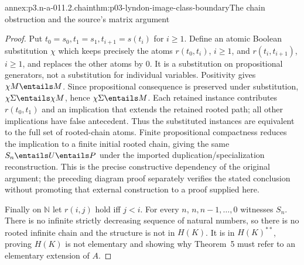 \begin{annexitem}{annex:p3.n-a-011.2.chain}{thm:p03-lyndon-image-class-boundary}{The chain obstruction and the source's matrix argument}
\begin{proof}
Put \(t_0=s_0,t_1=s_1,t_{i+1}=s(t_i)\) for \(i\geq1\).
Define an atomic Boolean substitution \(\chi\) which keeps precisely
the atoms \(r(t_0,t_i)\), \(i\geq1\), and
\(r(t_i,t_{i+1})\), \(i\geq1\), and replaces the other atoms by
\(0\). It is a substitution on propositional generators, not a
substitution for individual variables. Positivity gives
\(\chi M\entails M\). Since propositional consequence is preserved
under substitution, \(\chi\Sigma\entails\chi M\), hence
\(\chi\Sigma\entails M\). Each retained instance contributes
\(r(t_0,t_1)\) and an implication that extends the retained rooted
path; all other implications have false antecedent. Thus the substituted
instances are equivalent to the full set of rooted-chain atoms.
Finite propositional compactness reduces the implication to a finite
initial rooted chain, giving the same \(S_n\entails U\entails P\)
under the imported duplication/specialization reconstruction. This is
the precise constructive dependency of the original argument; the
preceding diagram proof separately verifies the stated conclusion
without promoting that external construction to a proof supplied here.

Finally on \(\mathbb N\) let \(r(i,j)\) hold iff \(j<i\).
For every \(n\), \(n,n-1,\ldots,0\) witnesses \(S_n\).
There is no infinite strictly decreasing sequence of natural numbers,
so there is no rooted infinite chain and the structure is not in \(H(K)\).
It is in \(H(K)^{**}\), proving \(H(K)\) is not elementary and
showing why Theorem~5 must refer to an elementary extension of \(A\).
\end{proof}
\end{annexitem}

